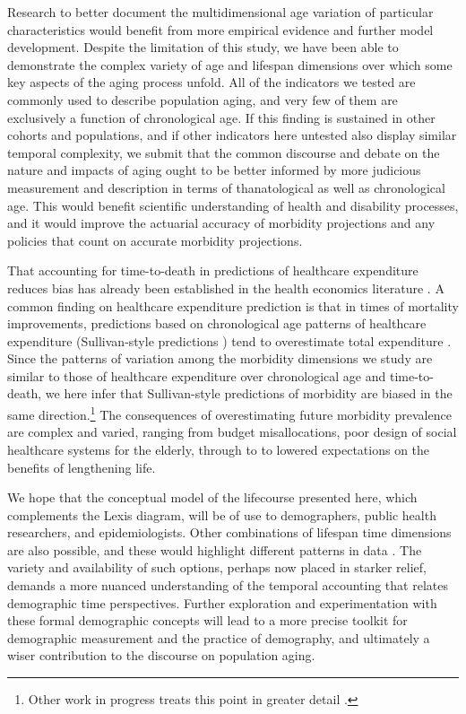 \documentclass[11pt,oneside]{article} %
\begin{document}
Research to better document the multidimensional age variation of particular
characteristics would benefit from more empirical evidence and further model
development.
Despite the limitation of this study, we have been able to demonstrate the
complex variety of age and lifespan dimensions over which some key aspects of the aging process unfold. All of the indicators we tested are commonly used to describe population aging, and
very few of them are exclusively a function of chronological age. If this
finding is sustained in other cohorts and populations, and if other indicators
here untested also display similar temporal complexity, we submit that the
common discourse and debate on the nature and impacts of aging ought to be
better informed by more judicious measurement and description in terms of
thanatological as well as chronological age. This would benefit scientific
understanding of health and disability processes, and it would improve
the actuarial accuracy of morbidity projections and any policies that count
on accurate morbidity projections. 

That accounting for time-to-death in predictions of
healthcare expenditure reduces bias has already been established in the health
economics literature \citep[e.g.,][]{stearns2004time}. A common finding
on healthcare expenditure prediction is that in times of mortality improvements,
predictions based on chronological age patterns of healthcare
expenditure (Sullivan-style predictions \citep{sullivan1970}) tend
to overestimate total expenditure \citep[e.g.,][]{geue2014population}. 
Since the patterns of variation among the morbidity dimensions we study are
similar to those of healthcare expenditure over chronological age and
time-to-death, we here infer that Sullivan-style predictions of morbidity are
biased in the same direction.\footnote{Other work in progress treats this point
in greater detail \citep{vanRaalte2015HLE}.} The consequences of overestimating
future morbidity prevalence are complex and varied, ranging from
budget misallocations, poor design of social healthcare systems for the elderly,
through to to lowered expectations on the benefits of lengthening life.

We hope that the conceptual model of the
lifecourse presented here, which complements the Lexis diagram, will be of use
to demographers, public health researchers, and epidemiologists. Other combinations
of lifespan time dimensions are also possible, and these would highlight
different patterns in data \citep{rsv2015}. The variety and availability of such
options, perhaps now placed in starker relief, demands a more nuanced understanding of the temporal accounting that relates demographic time
perspectives. Further exploration and experimentation with these formal
demographic concepts will lead to a more precise toolkit for demographic
measurement and the practice of demography, and ultimately a wiser contribution
to the discourse on population aging.
\end{document}
